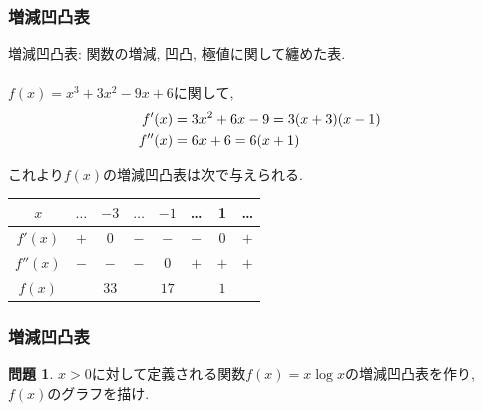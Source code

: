 \documentclass[dvipdfmx,cjk,10.2pt]{beamer}
\newcommand{\nel}{
\begin{tikzpicture}[scale=0.3,baseline=0.3]
\draw[->,>=stealth] (0,0) to[bend left=45] (1.2,1);
\end{tikzpicture}
}
\newcommand{\sel}{
\begin{tikzpicture}[scale=0.3,baseline=0.3]
\draw[->,>=stealth] (0,1) to[bend left=45] (1,0);
\end{tikzpicture}
}
\newcommand{\ser}{
\begin{tikzpicture}[scale=0.3,baseline=0.3]
\draw[->,>=stealth] (0,1) to[bend right=45] (1.2,0);
\end{tikzpicture}
}
\newcommand{\ner}{
\begin{tikzpicture}[scale=0.3,baseline=0.3]
\draw[->,>=stealth] (0,0) to[bend right=45] (1,1);
\end{tikzpicture}
}
\theoremstyle{definition}
\newtheorem{Prob}[Thm]{問題}
\begin{document}



\begin{frame}
\frametitle{増減凹凸表}

増減凹凸表: 関数の増減, 凹凸, 極値に関して纏めた表.\\
\ \\

$f(x)=x^3+3x^2-9x+6$に関して, 
\begin{align*}
f'(x) &= 3x^2+6x-9=3(x+3)(x-1) \\
f''(x) &= 6x+6=6(x+1)\vspace{-4.5mm}
\end{align*}

これより$f(x)$の増減凹凸表は次で与えられる. 

\begin{table}[htb]
\begin{center}
\begin{tabular}{c|c|c|c|c|c|c|c}
$x$ & $\dots$ & $-3$ & $\dots$ & $-1$ & \dots & 1 & \dots \\ \hline 
$f'(x)$   & $+$ & $0$  & $-$ & $-$ & $-$  & $0$ & $+$   \\ \hline 
$f ''(x)$   & $-$ & $-$  & $-$ & $0$ &  $+$ & $+$  & $+$   \\ \hline 
$f(x)$   & \nel  & $33$ & \sel & $17$ & \ser &  $1$  & \ner   
  \end{tabular}
  \end{center}
\end{table}

\end{frame}






\begin{frame}
\frametitle{増減凹凸表}

\begin{Prob}
$x>0$に対して定義される関数$f(x)=x\log x$の増減凹凸表を作り, $f(x)$のグラフを描け. 
\end{Prob}

\vspace{5.5cm}

\end{frame}
\end{document}
